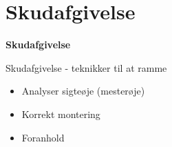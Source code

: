 \section{Skudafgivelse}

\begin{frame}
  \vspace{3em}
  \begin{center}
    {\LARGE \textbf{Skudafgivelse}
    }
    \\
    \vspace{1em}
  \end{center}
\end{frame}

\begin{frame}{Skudafgivelse - teknikker til at ramme}
    \begin{itemize}
        \item Analyser sigteøje (mesterøje)
        \item Korrekt montering
        \item Foranhold
    \end{itemize}
\end{frame}